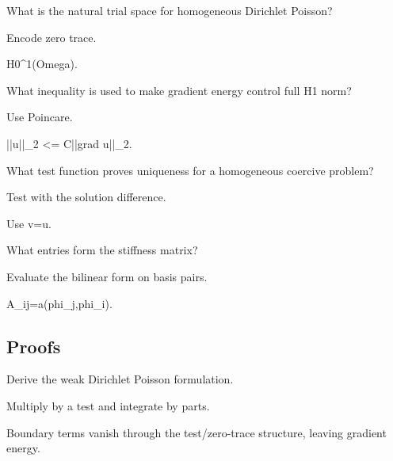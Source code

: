 \begin{exercise}\label{exr:iii23-expand-02}
What is the natural trial space for homogeneous Dirichlet Poisson?
\end{exercise}
\begin{hint}
Encode zero trace.
\end{hint}
\begin{solution}
H0\textasciicircum{}1(Omega).
\end{solution}

\begin{exercise}[Coercivity]\label{exr:iii23-expand-03}
What inequality is used to make gradient energy control full H1 norm?
\end{exercise}
\begin{hint}
Use Poincare.
\end{hint}
\begin{solution}
||u||\_2 <= C||grad u||\_2.
\end{solution}

\begin{exercise}\label{exr:iii23-expand-04}
What test function proves uniqueness for a homogeneous coercive problem?
\end{exercise}
\begin{hint}
Test with the solution difference.
\end{hint}
\begin{solution}
Use v=u.
\end{solution}

\begin{exercise}\label{exr:iii23-expand-05}
What entries form the stiffness matrix?
\end{exercise}
\begin{hint}
Evaluate the bilinear form on basis pairs.
\end{hint}
\begin{solution}
A\_ij=a(phi\_j,phi\_i).
\end{solution}

\subsection*{Proofs}

\begin{exercise}\label{exr:iii23-expand-06}
Derive the weak Dirichlet Poisson formulation.
\end{exercise}
\begin{hint}
Multiply by a test and integrate by parts.
\end{hint}
\begin{solution}
Boundary terms vanish through the test/zero-trace structure, leaving gradient energy.
\end{solution}

